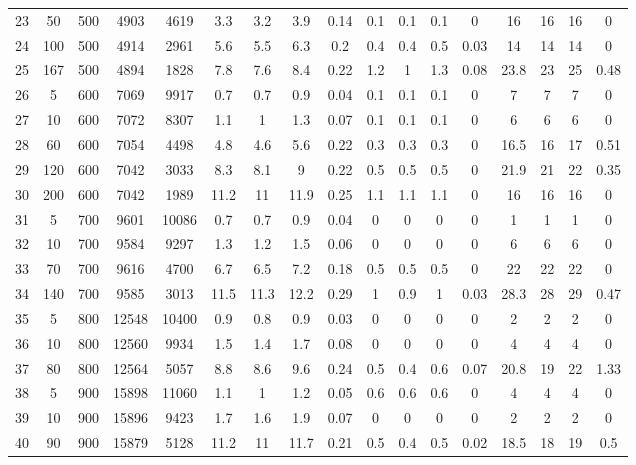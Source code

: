 \documentclass[11pt]{article}
\begin{document}
\begin{landscape}
\begin{longtable}[c]{ccccc|cccc|cccc|cccc}
		\rowcolor[HTML]{EFEFEF} 
		23 & 50 & 500 & 4903 & 4619 & 3.3 & 3.2 & 3.9 & 0.14 & 0.1 & 0.1 & 0.1 & 0 & 16 & 16 & 16 & 0 \\
		\rowcolor[HTML]{EFEFEF} 
		24 & 100 & 500 & 4914 & 2961 & 5.6 & 5.5 & 6.3 & 0.2 & 0.4 & 0.4 & 0.5 & 0.03 & 14 & 14 & 14 & 0 \\
		\rowcolor[HTML]{EFEFEF} 
		25 & 167 & 500 & 4894 & 1828 & 7.8 & 7.6 & 8.4 & 0.22 & 1.2 & 1 & 1.3 & 0.08 & 23.8 & 23 & 25 & 0.48 \\
		26 & 5 & 600 & 7069 & 9917 & 0.7 & 0.7 & 0.9 & 0.04 & 0.1 & 0.1 & 0.1 & 0 & 7 & 7 & 7 & 0 \\
		27 & 10 & 600 & 7072 & 8307 & 1.1 & 1 & 1.3 & 0.07 & 0.1 & 0.1 & 0.1 & 0 & 6 & 6 & 6 & 0 \\
		28 & 60 & 600 & 7054 & 4498 & 4.8 & 4.6 & 5.6 & 0.22 & 0.3 & 0.3 & 0.3 & 0 & 16.5 & 16 & 17 & 0.51 \\
		29 & 120 & 600 & 7042 & 3033 & 8.3 & 8.1 & 9 & 0.22 & 0.5 & 0.5 & 0.5 & 0 & 21.9 & 21 & 22 & 0.35 \\
		30 & 200 & 600 & 7042 & 1989 & 11.2 & 11 & 11.9 & 0.25 & 1.1 & 1.1 & 1.1 & 0 & 16 & 16 & 16 & 0 \\
		\rowcolor[HTML]{EFEFEF} 
		31 & 5 & 700 & 9601 & 10086 & 0.7 & 0.7 & 0.9 & 0.04 & 0 & 0 & 0 & 0 & 1 & 1 & 1 & 0 \\
		\rowcolor[HTML]{EFEFEF} 
		32 & 10 & 700 & 9584 & 9297 & 1.3 & 1.2 & 1.5 & 0.06 & 0 & 0 & 0 & 0 & 6 & 6 & 6 & 0 \\
		\rowcolor[HTML]{EFEFEF} 
		33 & 70 & 700 & 9616 & 4700 & 6.7 & 6.5 & 7.2 & 0.18 & 0.5 & 0.5 & 0.5 & 0 & 22 & 22 & 22 & 0 \\
		\rowcolor[HTML]{EFEFEF} 
		34 & 140 & 700 & 9585 & 3013 & 11.5 & 11.3 & 12.2 & 0.29 & 1 & 0.9 & 1 & 0.03 & 28.3 & 28 & 29 & 0.47 \\
		35 & 5 & 800 & 12548 & 10400 & 0.9 & 0.8 & 0.9 & 0.03 & 0 & 0 & 0 & 0 & 2 & 2 & 2 & 0 \\
		36 & 10 & 800 & 12560 & 9934 & 1.5 & 1.4 & 1.7 & 0.08 & 0 & 0 & 0 & 0 & 4 & 4 & 4 & 0 \\
		37 & 80 & 800 & 12564 & 5057 & 8.8 & 8.6 & 9.6 & 0.24 & 0.5 & 0.4 & 0.6 & 0.07 & 20.8 & 19 & 22 & 1.33 \\
		\rowcolor[HTML]{EFEFEF} 
		38 & 5 & 900 & 15898 & 11060 & 1.1 & 1 & 1.2 & 0.05 & 0.6 & 0.6 & 0.6 & 0 & 4 & 4 & 4 & 0 \\
		\rowcolor[HTML]{EFEFEF} 
		39 & 10 & 900 & 15896 & 9423 & 1.7 & 1.6 & 1.9 & 0.07 & 0 & 0 & 0 & 0 & 2 & 2 & 2 & 0 \\
		\rowcolor[HTML]{EFEFEF} 
		40 & 90 & 900 & 15879 & 5128 & 11.2 & 11 & 11.7 & 0.21 & 0.5 & 0.4 & 0.5 & 0.02 & 18.5 & 18 & 19 & 0.5
	\end{longtable}
\end{landscape}
\end{document}
